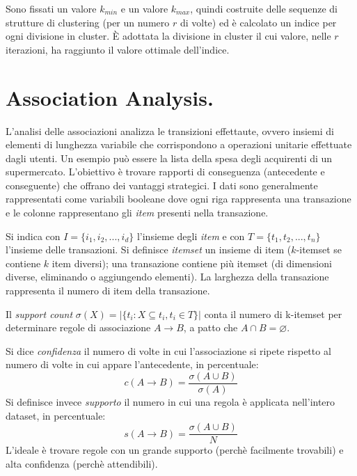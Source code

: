 \documentclass[11pt, a4page, twocolumn]{article}
\begin{document}
Sono fissati un valore $k_{min}$ e un valore $k_{max}$, quindi costruite delle sequenze di strutture di clustering (per un numero $r$ di volte) ed è calcolato un indice per ogni divisione in cluster.
È adottata la divisione in cluster il cui valore, nelle $r$ iterazioni, ha raggiunto il valore ottimale dell'indice. \newpage



\newpage
\part{Association Analysis.}
L'analisi delle associazioni analizza le transizioni effettaute, ovvero insiemi di elementi di lunghezza variabile che corrispondono a operazioni unitarie effettuate dagli utenti.
Un esempio può essere la lista della spesa degli acquirenti di un supermercato.
L'obiettivo è trovare rapporti di conseguenza (antecedente e conseguente) che offrano dei vantaggi strategici.
I dati sono generalmente rappresentati come variabili booleane dove ogni riga rappresenta una transazione e le colonne rappresentano gli \textit{item} presenti nella transazione.

Si indica con $I = \{i_1, i_2, ..., i_d\}$ l'insieme degli \textit{item} e con $T = \{t_1, t_2, ..., t_n\}$ l'insieme delle transazioni.
Si definisce \textit{itemset} un insieme di item ($k$-itemset se contiene $k$ item diversi); una transazione contiene più itemset (di dimensioni diverse, eliminando o aggiungendo elementi).
La larghezza della transazione rappresenta il numero di item della transazione.

Il \textit{support count} $\sigma(X) = |\{t_i : X \subseteq t_i, t_i \in T\}|$ conta il numero di k-itemset per determinare regole di associazione $A \rightarrow B$, a patto che $A \cap B = \varnothing$.

Si dice \textit{confidenza} il numero di volte in cui l'associazione si ripete rispetto al numero di volte in cui appare l'antecedente, in percentuale:
\begin{equation*}
c(A \rightarrow B) = \frac{\sigma(A \cup B)}{\sigma(A)}
\end{equation*}
Si definisce invece \textit{supporto} il numero in cui una regola è applicata nell'intero dataset, in percentuale:
\begin{equation*}
s(A \rightarrow B) = \frac{\sigma(A \cup B)}{N}
\end{equation*}
L'ideale è trovare regole con un grande supporto (perchè facilmente trovabili) e alta confidenza (perchè attendibili).
\end{document}
